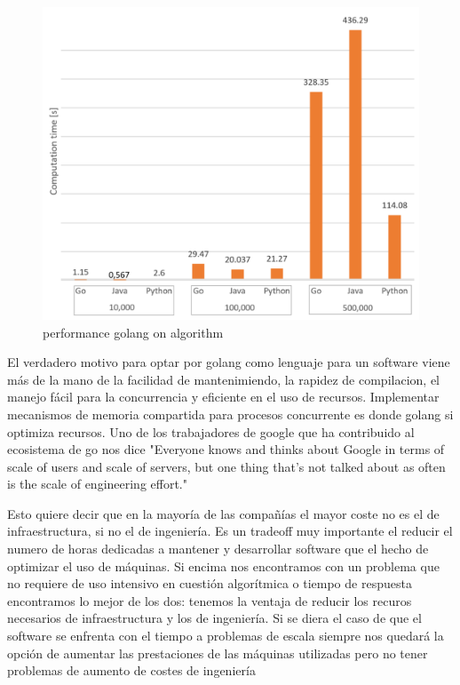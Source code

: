 \begin{figure}[H]
	\includegraphics[height=0.3\textheight]{./part/Proyecto_ejecutivo/memoria_constructiva/golang/img/compTime}
	\caption[performance golang on algorithm]{performance golang on algorithm\cite{Dymora20201}}\label{fig:performance golang}
\end{figure}

El verdadero motivo para optar por golang como lenguaje para un software viene más de la mano de la facilidad de mantenimiendo, la rapidez de compilacion, el manejo fácil para la concurrencia y eficiente en el uso de recursos. Implementar mecanismos de memoria compartida para procesos concurrente es donde golang si optimiza recursos. Uno de los trabajadores de google que ha contribuido al ecosistema de go nos dice "Everyone knows and thinks about Google in terms of scale of users and scale of servers, but one thing that's not talked about as often is the scale of engineering effort."~\cite{Meyerson2014104+101}

Esto quiere decir que en la mayoría de las compañías el mayor coste no es el de infraestructura, si no el de ingeniería. Es un tradeoff muy importante el reducir el numero de horas dedicadas a mantener y desarrollar software que el hecho de optimizar el uso de máquinas. Si encima nos encontramos con un problema que no requiere de uso intensivo en cuestión algorítmica o tiempo de respuesta encontramos lo mejor de los dos: tenemos la ventaja de reducir los recuros necesarios de infraestructura y los de ingeniería. Si se diera el caso de que el software se enfrenta con el tiempo a problemas de escala siempre nos quedará la opción de aumentar las prestaciones de las máquinas utilizadas pero no tener problemas de aumento de costes de ingeniería


